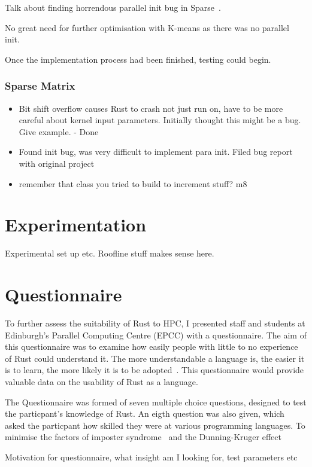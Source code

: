 Talk about finding horrendous parallel init bug in Sparse~\cite{SparseBug}.

No great need for further optimisation with K-means as there was no parallel init.

Once the implementation process had been finished, testing could begin.


\subsubsection{Sparse Matrix}
\begin{itemize}
  \item Bit shift overflow causes Rust to crash not just run on, have to be more careful about kernel input parameters. Initially thought this might be a bug. Give example. - Done
  \item Found init bug, was very difficult to implement para init. Filed bug report with original project
  \item remember that class you tried to build to increment stuff? m8
\end{itemize}

\section{Experimentation}
Experimental set up etc. Roofline stuff makes sense here.
\section{Questionnaire}
To further assess the suitability of Rust to HPC, I presented staff and students at Edinburgh's Parallel Computing Centre (EPCC) with a questionnaire. The aim of this questionnaire was to examine how easily people with little to no experience of Rust could understand it. The more understandable a language is, the easier it is to learn, the more likely it is to be adopted~. This questionnaire would provide valuable data on the usability of Rust as a language.

The Questionnaire was formed of seven multiple choice questions, designed to test the particpant's knowledge of Rust. An eigth question was also given, which asked the particpant how skilled they were at various programming languages.
To minimise the factors of imposter syndrome~\cite{langford1993} and the Dunning-Kruger effect~\cite{kruger1999}

Motivation for questionnaire, what insight am I looking for, test parameters etc
